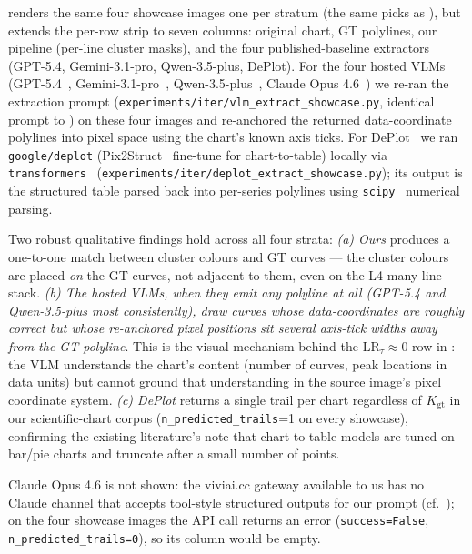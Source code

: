 \documentclass{article}
\begin{document}
 renders the same four showcase
images one per stratum (the same picks as
), but extends the per-row strip
to seven columns: original chart, GT polylines, our pipeline
(per-line cluster masks), and the four published-baseline
extractors (GPT-5.4, Gemini-3.1-pro, Qwen-3.5-plus, DePlot).
For the four hosted VLMs (GPT-5.4~\citep{openai_release_2026},
Gemini-3.1-pro~\citep{google_release_2026},
Qwen-3.5-plus~\citep{qwen_release_2026},
Claude Opus 4.6~\citep{anthropic_release_2026}) we re-ran the
extraction prompt (\texttt{experiments/iter/vlm\_extract\_showcase.py},
identical prompt to ) on these four
images and re-anchored the returned data-coordinate polylines into
pixel space using the chart's known axis ticks. For
DePlot~\citep{deplot} we ran \texttt{google/deplot}
(Pix2Struct~\citep{pix2struct} fine-tune for chart-to-table)
locally via \texttt{transformers}~\citep{huggingface}
(\texttt{experiments/iter/deplot\_extract\_showcase.py}); its
output is the structured table parsed back into per-series
polylines using \texttt{scipy}~\citep{scipy} numerical parsing.

Two robust qualitative findings hold across all four strata:
\emph{(a) Ours} produces a one-to-one match between cluster
colours and GT curves --- the cluster colours are placed
\emph{on} the GT curves, not adjacent to them, even on the L4
many-line stack. \emph{(b) The hosted VLMs, when they emit any
polyline at all (GPT-5.4 and Qwen-3.5-plus most consistently),
draw curves whose data-coordinates are roughly correct but whose
re-anchored pixel positions sit several axis-tick widths away
from the GT polyline}. This is the visual mechanism behind the
$\mathrm{LR}_\tau{\approx}0$ row in :
the VLM understands the chart's content (number of curves, peak
locations in data units) but cannot ground that understanding in
the source image's pixel coordinate system. \emph{(c) DePlot}
returns a single trail per chart regardless of $K_{\mathrm{gt}}$
in our scientific-chart corpus (\texttt{n\_predicted\_trails}=1
on every showcase), confirming the existing literature's note
that chart-to-table models are tuned on bar/pie charts and
truncate after a small number of points.

Claude Opus 4.6 is not shown: the viviai.cc gateway available to
us has no Claude channel that accepts tool-style structured
outputs for our prompt (cf.\ ); on the four
showcase images the API call returns an error
(\texttt{success=False}, \texttt{n\_predicted\_trails=0}), so
its column would be empty.
\end{document}
